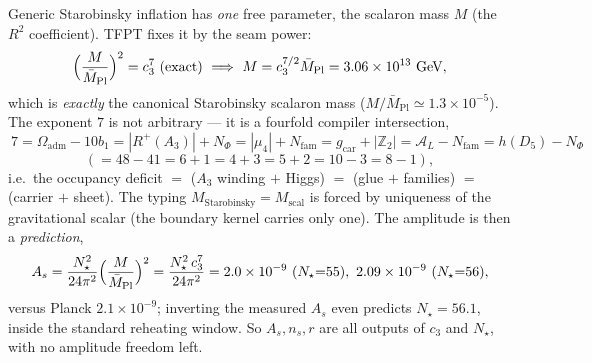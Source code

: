 \documentclass[11pt,a4paper]{article}
\newcommand{\Mbar}{\bar M_{\mathrm{Pl}}}
\newcommand{\gcar}{g_{\mathrm{car}}}
\newcommand{\Nfam}{N_{\mathrm{fam}}}
\newcommand{\Oadm}{\Omega_{\mathrm{adm}}}
\newcommand{\cthree}{c_3}
\newcommand{\Z}{\mathbb{Z}}
\theoremstyle{definition}
\begin{document}
\begin{winbox}
Generic Starobinsky inflation has \emph{one} free parameter, the scalaron mass $M$ (the $R^2$
coefficient). TFPT fixes it by the seam power:
\[
  \Bigl(\frac{M}{\Mbar}\Bigr)^2=\cthree^7\ \text{(exact)}\ \Longrightarrow\ M=\cthree^{7/2}\Mbar
  =3.06\times10^{13}\ \mathrm{GeV},
\]
which is \emph{exactly} the canonical Starobinsky scalaron mass ($M/\Mbar\simeq1.3\times10^{-5}$). The
exponent $7$ is not arbitrary --- it is a fourfold compiler intersection,
\[
  \boxed{\ 7=\Oadm-10b_1=|R^+(A_3)|+N_\Phi=|\mu_4|+\Nfam=\gcar+|\Z_2|=\mathcal A_L-\Nfam=h(D_5)-N_\Phi\ }
\]
\[
  (=48{-}41=6{+}1=4{+}3=5{+}2=10{-}3=8{-}1),
\]
i.e.\ the occupancy deficit $=$ ($A_3$ winding $+$ Higgs) $=$ (glue $+$ families) $=$ (carrier $+$ sheet).
The typing $M_{\mathrm{Starobinsky}}=M_{\mathrm{scal}}$ is forced by uniqueness of the gravitational scalar
(the boundary kernel carries only one). The amplitude is then a \emph{prediction},
\[
  A_s=\frac{N_\star^2}{24\pi^2}\Bigl(\frac{M}{\Mbar}\Bigr)^2=\frac{N_\star^2\,\cthree^7}{24\pi^2}
  =2.0\times10^{-9}\ (N_\star{=}55),\ 2.09\times10^{-9}\ (N_\star{=}56),
\]
versus Planck $2.1\times10^{-9}$; inverting the measured $A_s$ even predicts $N_\star=56.1$, inside the
standard reheating window. So $A_s,n_s,r$ are all outputs of $\cthree$ and $N_\star$, with no amplitude
freedom left.
\end{winbox}
\end{document}
